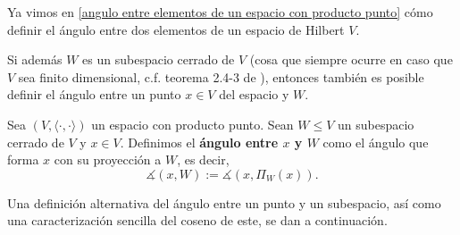 Ya vimos en \ref{angulo entre elementos de un espacio con producto punto}
cómo definir el ángulo entre dos elementos de un espacio
de Hilbert $V$.

Si además $W$ es un subespacio cerrado de $V$
(cosa que siempre ocurre en caso que
$V$ sea finito dimensional, c.f. teorema 2.4-3 de \cite{Kreyszig}), entonces también
es posible definir el ángulo entre un punto $x \in V$
del espacio y $W$.

\begin{defi} \label{def: angulo punto subespacio}
Sea $(V, \langle \cdot , \cdot \rangle)$ un espacio con 
producto punto. Sean $W \leq V$ un subespacio cerrado de $V$
y $x \in V$. Definimos el \textbf{ángulo entre $x$ y $W$}
como el ángulo que forma 
$x$ con su proyección a $W$, es decir,
\[
\measuredangle (x, W):= \measuredangle(x, \Pi_{W}(x)).
\]
\end{defi}

Una definición alternativa del ángulo entre un punto y un subespacio,
así como una caracterización sencilla del coseno de este,
se dan a continuación.

